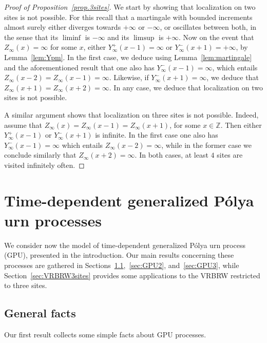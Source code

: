 \documentclass[10pt,a4paper]{amsart}
\newcommand{\1}{{\text{\Large $\mathfrak 1$}}}
\begin{document}
\begin{proof}[Proof of Proposition~\ref{prop.3sites}]
We start by showing that localization on two sites is not possible. For this recall that a martingale with bounded increments almost surely  either diverges towards $+\infty$ or $-\infty$, or oscillates between both, in the sense that its $\liminf$ is $-\infty$ and its $\limsup$ is $+\infty$. Now on the event that $Z_\infty(x) = \infty$ for some $x$, either $Y_\infty^+(x-1)=\infty$ or $Y_\infty^-(x+1) = +\infty$, by Lemma~\ref{lem:Ypm}. In the first case, we deduce using Lemma~\ref{lem:martingale} and the aforementioned result that one also has $Y_\infty^-(x-1) = \infty$, which entails $Z_\infty(x-2) =Z_\infty(x-1)= \infty$. Likewise, if $Y_\infty^-(x+1) = \infty$, we deduce that $Z_\infty(x+1) = Z_\infty(x+2) = \infty$. In any case, we deduce that localization on two sites is not possible.  


A similar argument shows that localization on three sites is not possible. Indeed, assume that $Z_\infty(x) = Z_\infty(x-1) = Z_\infty(x+1)$, for some $x\in \mathbb Z$. Then either $Y_\infty^+(x-1)$ or $Y_\infty^-(x+1)$ is infinite. In the first case one also has $Y_\infty^-(x-1) = \infty$ which entails $Z_\infty(x-2) = \infty$, while in the former case we conclude similarly that $Z_\infty(x+2) = \infty$. In both cases, at least $4$ sites are visited infinitely often.   
\end{proof}




\section{Time-dependent generalized P\'olya urn processes} \label{sec:urns}
We consider now the model of time-dependent generalized P\'olya urn process (GPU), presented in the introduction. Our main results concerning these processes are gathered in 
Sections~\ref{sec:GPU},~\ref{sec:GPU2}, and~\ref{sec:GPU3}, while Section~\ref{sec:VRBRW3sites} provides some applications to the VRBRW restricted to three sites.  


\subsection{General facts} \label{sec:GPU}
Our first result collects some simple facts about GPU processes. 
\end{document}
